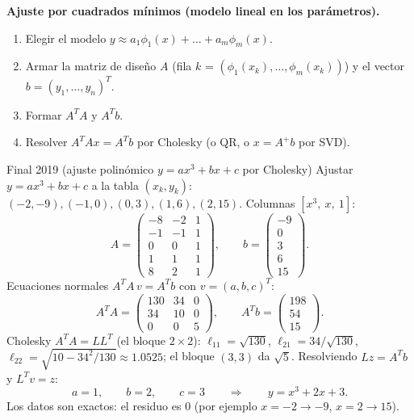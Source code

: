 \begin{receta}
\textbf{Ajuste por cuadrados mínimos (modelo lineal en los parámetros).}
\begin{enumerate}
\item Elegir el modelo $y\approx a_1\phi_1(x)+\dots+a_m\phi_m(x)$.
\item Armar la matriz de diseño $A$ (fila $k$ = $(\phi_1(x_k),\dots,\phi_m(x_k))$) y el vector $b=(y_1,\dots,y_n)^T$.
\item Formar $A^TA$ y $A^Tb$.
\item Resolver $A^TAx=A^Tb$ por Cholesky (o QR, o $x=A^{+}b$ por SVD).
\end{enumerate}
\end{receta}

\begin{ejemplo}{Final 2019 (ajuste polinómico $y=ax^3+bx+c$ por Cholesky)}
Ajustar $y=ax^3+bx+c$ a la tabla $(x_k,y_k)$: $(-2,-9),(-1,0),(0,3),(1,6),(2,15)$. Columnas $[x^3,\ x,\ 1]$:
\[
A=\begin{pmatrix} -8 & -2 & 1 \\ -1 & -1 & 1 \\ 0 & 0 & 1 \\ 1 & 1 & 1 \\ 8 & 2 & 1 \end{pmatrix},
\qquad
b=\begin{pmatrix} -9 \\ 0 \\ 3 \\ 6 \\ 15 \end{pmatrix}.
\]
Ecuaciones normales $A^TA\,v=A^Tb$ con $v=(a,b,c)^T$:
\[
A^TA=\begin{pmatrix} 130 & 34 & 0 \\ 34 & 10 & 0 \\ 0 & 0 & 5 \end{pmatrix},
\qquad
A^Tb=\begin{pmatrix} 198 \\ 54 \\ 15 \end{pmatrix}.
\]
Cholesky $A^TA=LL^T$ (el bloque $2\times2$): $\ell_{11}=\sqrt{130}$, $\ell_{21}=34/\sqrt{130}$, $\ell_{22}=\sqrt{10-34^2/130}\approx1.0525$; el bloque $(3,3)$ da $\sqrt5$. Resolviendo $Lz=A^Tb$ y $L^Tv=z$:
\[
a=1,\qquad b=2,\qquad c=3
\qquad\Longrightarrow\qquad y=x^3+2x+3 .
\]
Los datos son exactos: el residuo es $0$ (por ejemplo $x=-2\to-9$, $x=2\to15$).
\end{ejemplo}

